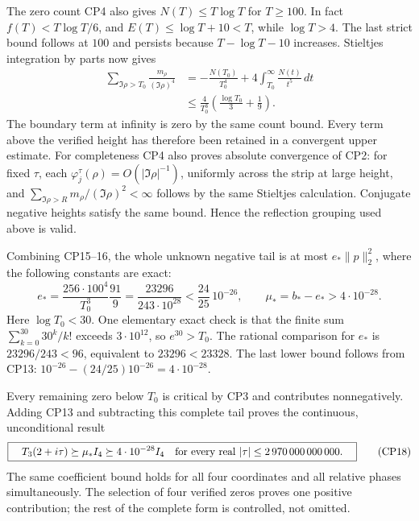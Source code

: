 \documentclass[11pt]{article}
\begin{document}
The zero count CP4 also gives $N(T)\le T\log T$ for $T\ge100$.
In fact $f(T)<T\log T/6$, and
$E(T)\le\log T+10<T$, while $\log T>4$.
The last strict bound follows at $100$ and persists because
$T-\log T-10$ increases. Stieltjes integration by parts now gives
\begin{align}
\sum_{\Im\rho>T_0}\frac{m_\rho}{(\Im\rho)^4}
&=-\frac{N(T_0)}{T_0^4}
     +4\int_{T_0}^\infty\frac{N(t)}{t^5}\,dt\nonumber\\
&\le\frac4{T_0^3}
              \left(\frac{\log T_0}{3}+\frac19\right).
\tag{CP16}
\end{align}
The boundary term at infinity is zero by the same count bound.
Every term above the verified height has therefore been retained
in a convergent upper estimate.
For completeness CP4 also proves absolute convergence of CP2:
for fixed $\tau$, each $\varphi_j^\tau(\rho)=O(|\Im\rho|^{-1})$,
uniformly across the strip at large height, and
$\sum_{\Im\rho>R}m_\rho/(\Im\rho)^2<\infty$ follows by the
same Stieltjes calculation. Conjugate negative heights satisfy
the same bound. Hence the reflection grouping used above is valid.

Combining CP15--16, the whole unknown negative tail is at most
$e_*\|p\|_2^2$, where the following constants are exact:
\begin{equation}
e_*=\frac{256\cdot100^4}{T_0^3}\frac{91}{9}
=\frac{23296}{243\cdot10^{28}}
<\frac{24}{25}\,10^{-26},\qquad
\mu_*=b_*-e_*>4\cdot10^{-28}.
\tag{CP17}
\end{equation}
Here $\log T_0<30$. One elementary exact check is that the
finite sum $\sum_{k=0}^{30}30^k/k!$ exceeds $3\cdot10^{12}$,
so $e^{30}>T_0$. The rational comparison for $e_*$ is
$23296/243<96$, equivalent to $23296<23328$.
The last lower bound follows from CP13:
$10^{-26}-(24/25)10^{-26}=4\cdot10^{-28}$.

Every remaining zero below $T_0$ is critical by CP3 and
contributes nonnegatively. Adding CP13 and subtracting this
complete tail proves the continuous, unconditional result
\begin{equation}
\boxed{\quad
T_3(2+i\tau)\succeq\mu_* I_4
\succeq4\cdot10^{-28}I_4
\quad\hbox{for every real }|\tau|\le2\,970\,000\,000\,000.
\quad}
\tag{CP18}
\end{equation}
The same coefficient bound holds for all four coordinates
and all relative phases simultaneously. The selection of four
verified zeros proves one positive contribution; the rest
of the complete form is controlled, not omitted.
\end{document}
